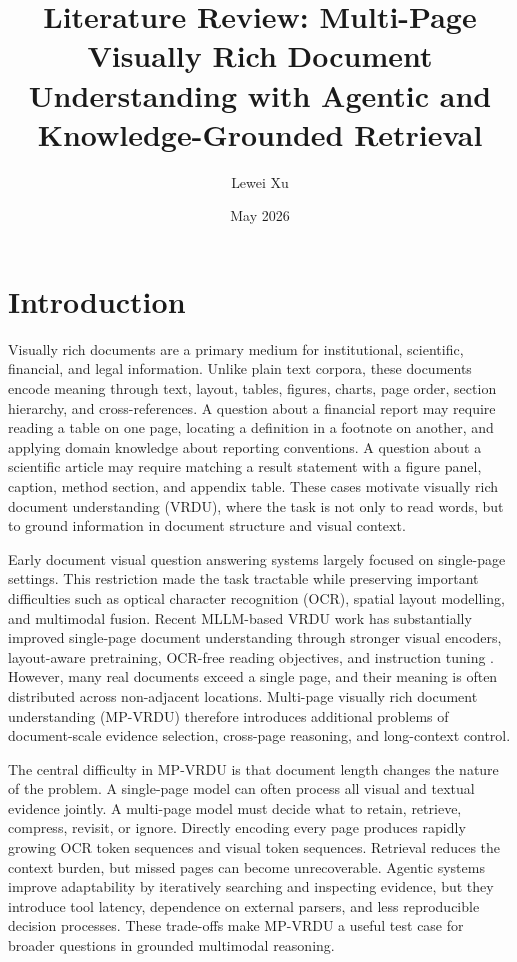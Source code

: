 \documentclass[10pt,a4paper]{article}
\title{Literature Review: Multi-Page Visually Rich Document Understanding with Agentic and Knowledge-Grounded Retrieval}
\author{Lewei Xu}
\date{May 2026}
\begin{document}
\maketitle

\section{Introduction}

Visually rich documents are a primary medium for institutional, scientific, financial, and legal information. Unlike plain text corpora, these documents encode meaning through text, layout, tables, figures, charts, page order, section hierarchy, and cross-references. A question about a financial report may require reading a table on one page, locating a definition in a footnote on another, and applying domain knowledge about reporting conventions. A question about a scientific article may require matching a result statement with a figure panel, caption, method section, and appendix table. These cases motivate visually rich document understanding (VRDU), where the task is not only to read words, but to ground information in document structure and visual context.

Early document visual question answering systems largely focused on single-page settings. This restriction made the task tractable while preserving important difficulties such as optical character recognition (OCR), spatial layout modelling, and multimodal fusion. Recent MLLM-based VRDU work has substantially improved single-page document understanding through stronger visual encoders, layout-aware pretraining, OCR-free reading objectives, and instruction tuning \cite{huang2022layoutlmv3,hu2024mplug,ding2025survey}. However, many real documents exceed a single page, and their meaning is often distributed across non-adjacent locations. Multi-page visually rich document understanding (MP-VRDU) therefore introduces additional problems of document-scale evidence selection, cross-page reasoning, and long-context control.

The central difficulty in MP-VRDU is that document length changes the nature of the problem. A single-page model can often process all visual and textual evidence jointly. A multi-page model must decide what to retain, retrieve, compress, revisit, or ignore. Directly encoding every page produces rapidly growing OCR token sequences and visual token sequences. Retrieval reduces the context burden, but missed pages can become unrecoverable. Agentic systems improve adaptability by iteratively searching and inspecting evidence, but they introduce tool latency, dependence on external parsers, and less reproducible decision processes. These trade-offs make MP-VRDU a useful test case for broader questions in grounded multimodal reasoning.
\end{document}
